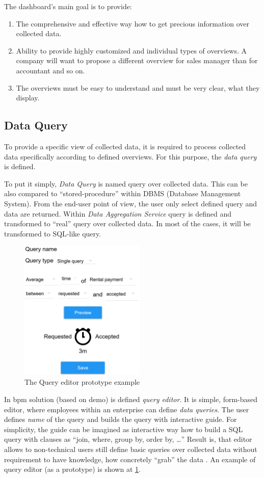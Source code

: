The dashboard's main goal is to provide:
\begin{enumerate}
\item The comprehensive and effective way how to get precious information over collected data.
\item Ability to provide highly customized and individual types of overviews. A company will want to propose a different overview for sales manager than for accountant and so on. 
\item The overviews must be easy to understand and must be very clear, what they display.
\end{enumerate}
\subsection{Data Query}
To provide a specific view of collected data, it is required to process collected data specifically according to defined overviews. For this purpose, the \textit{data query} is defined.

To put it simply, \textit{Data Query} is named query over collected data. This can be also compared to ``stored-procedure'' within DBMS (Database Management System). From the end-user point of view, the user only select defined query and data are returned. Within \textit{Data Aggregation Service} query is defined and transformed to ``real'' query over collected data. In most of the cases, it will be transformed to SQL-like query. 

\begin{figure}[ht!]
\centering
\includegraphics[width=6cm,keepaspectratio]{img/query-editor}
\caption{The Query editor prototype example}
\label{fig:query-editor}
\end{figure}

In \gls{bpm} solution (based on \gls{demo}) is defined \textit{query editor}. It is simple, form-based editor, where employees within an enterprise can define \textit{data queries}. The user defines \textit{name} of the query and builds the query with interactive guide. For simplicity, the guide can be imagined as interactive way how to build a SQL query with clauses as ``join, where, group by, order by, \dots'' Result is, that editor allows to non-technical users still define basic queries over collected data without requirement to have knowledge, how concretely ``grab'' the data . An example of query editor (as a prototype) is shown at \cref{fig:query-editor}.


